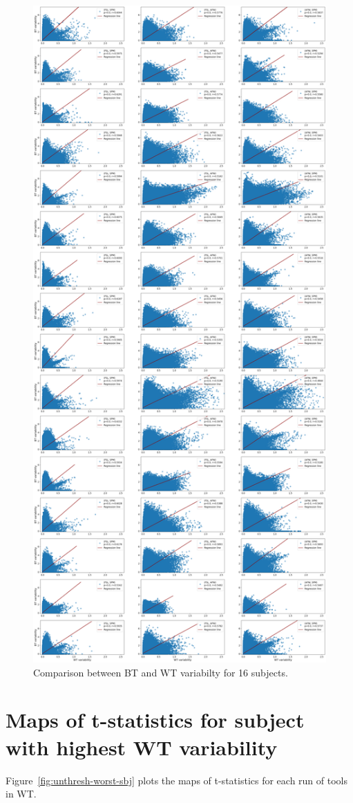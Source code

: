 \documentclass[11pt,onecolumn]{article}
\begin{document}
\begin{figure}[ht]
  \centering
  \includegraphics[width=.55\textwidth]{figures/sbj-abs-corr-unthresh-plot.png}
  \caption{Comparison between BT and WT variabilty for 16 subjects.}
  \label{fig:unthresh-correlation-allsbj}
\end{figure}

\section{Maps of t-statistics for subject with highest WT variability}
\label{sec:supp-worst-subject}

Figure~\ref{fig:unthresh-worst-sbj} plots the maps of t-statistics for each run of tools in WT.
\end{document}
